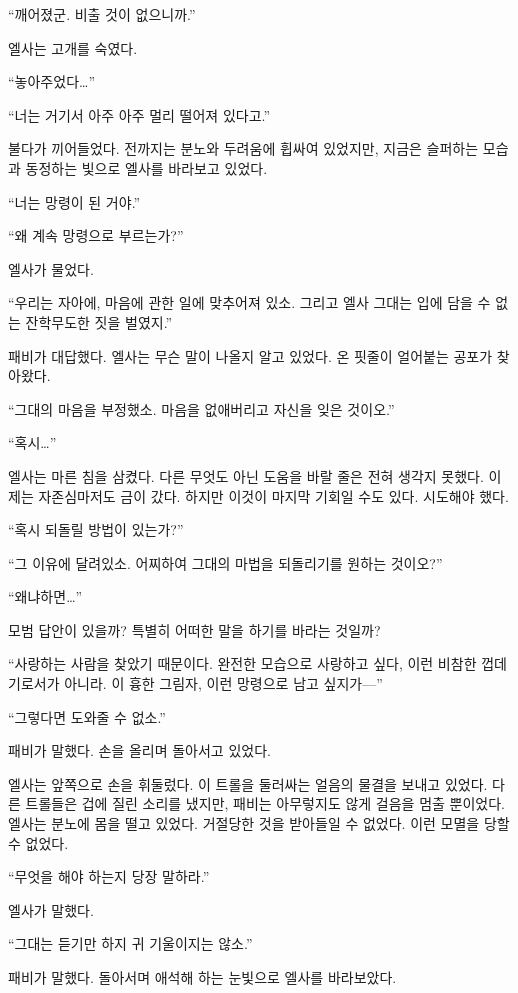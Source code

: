 ``깨어졌군. 비출 것이 없으니까.''

엘사는 고개를 숙였다.

``놓아주었다\ldots''

``너는 거기서 아주 아주 멀리 떨어져 있다고.''

불다가 끼어들었다. 전까지는 분노와 두려움에 휩싸여 있었지만, 지금은 슬퍼하는 모습과 동정하는 빛으로 엘사를 바라보고 있었다.

``너는 망령이 된 거야.''

``왜 계속 망령으로 부르는가?''

엘사가 물었다.

``우리는 자아에, 마음에 관한 일에 맞추어져 있소. 그리고 엘사 그대는 입에 담을 수 없는 잔학무도한 짓을 벌였지.''

패비가 대답했다. 엘사는 무슨 말이 나올지 알고 있었다. 온 핏줄이 얼어붙는 공포가 찾아왔다.

``그대의 마음을 부정했소. 마음을 없애버리고 자신을 잊은 것이오.''

``혹시\ldots''

엘사는 마른 침을 삼켰다. 다른 무엇도 아닌 도움을 바랄 줄은 전혀 생각지 못했다. 이제는 자존심마저도 금이 갔다. 하지만 이것이 마지막 기회일 수도 있다. 시도해야 했다.

``혹시 되돌릴 방법이 있는가?''

``그 이유에 달려있소. 어찌하여 그대의 마법을 되돌리기를 원하는 것이오?''

``왜냐하면\ldots''

모범 답안이 있을까? 특별히 어떠한 말을 하기를 바라는 것일까?

``사랑하는 사람을 찾았기 때문이다. 완전한 모습으로 사랑하고 싶다, 이런 비참한 껍데기로서가 아니라. 이 흉한 그림자, 이런 망령으로 남고 싶지가—''

``그렇다면 도와줄 수 없소.''

패비가 말했다. 손을 올리며 돌아서고 있었다.

엘사는 앞쪽으로 손을 휘둘렀다. 이 트롤을 둘러싸는 얼음의 물결을 보내고 있었다. 다른 트롤들은 겁에 질린 소리를 냈지만, 패비는 아무렇지도 않게 걸음을 멈출 뿐이었다. 엘사는 분노에 몸을 떨고 있었다. 거절당한 것을 받아들일 수 없었다. 이런 모멸을 당할 수 없었다.

``무엇을 해야 하는지 당장 말하라.''

엘사가 말했다.

``그대는 듣기만 하지 귀 기울이지는 않소.''

패비가 말했다. 돌아서며 애석해 하는 눈빛으로 엘사를 바라보았다.

